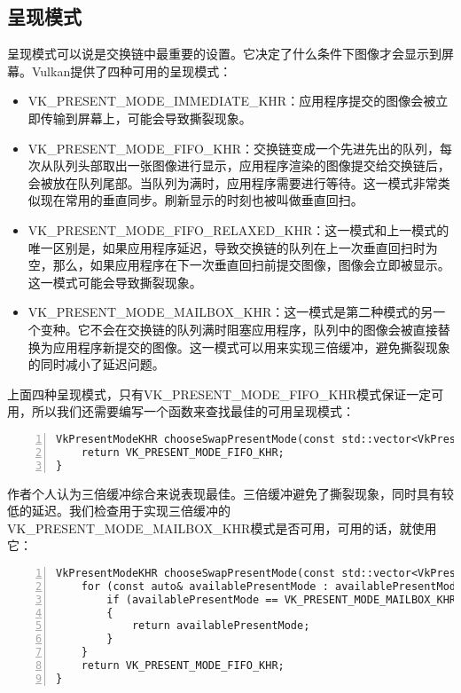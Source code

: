 \documentclass{ctexart}
\begin{document}
\subsection{呈现模式}

呈现模式可以说是交换链中最重要的设置。它决定了什么条件下图像才会显示到屏幕。Vulkan提供了四种可用的呈现模式：

\begin{itemize}
	\item VK\_PRESENT\_MODE\_IMMEDIATE\_KHR：应用程序提交的图像会被立即传输到屏幕上，可能会导致撕裂现象。
	\item VK\_PRESENT\_MODE\_FIFO\_KHR：交换链变成一个先进先出的队列，每次从队列头部取出一张图像进行显示，应用程序渲染的图像提交给交换链后，会被放在队列尾部。当队列为满时，应用程序需要进行等待。这一模式非常类似现在常用的垂直同步。刷新显示的时刻也被叫做垂直回扫。
	\item VK\_PRESENT\_MODE\_FIFO\_RELAXED\_KHR：这一模式和上一模式的唯一区别是，如果应用程序延迟，导致交换链的队列在上一次垂直回扫时为空，那么，如果应用程序在下一次垂直回扫前提交图像，图像会立即被显示。这一模式可能会导致撕裂现象。
	\item VK\_PRESENT\_MODE\_MAILBOX\_KHR：这一模式是第二种模式的另一个变种。它不会在交换链的队列满时阻塞应用程序，队列中的图像会被直接替换为应用程序新提交的图像。这一模式可以用来实现三倍缓冲，避免撕裂现象的同时减小了延迟问题。
\end{itemize}

上面四种呈现模式，只有VK\_PRESENT\_MODE\_FIFO\_KHR模式保证一定可用，所以我们还需要编写一个函数来查找最佳的可用呈现模式：

\begin{lstlisting}[language={[ANSI]C},keywordstyle=\color{blue!70},commentstyle=\color{red!50!green!50!blue!50},frame=shadowbox, rulesepcolor=\color{red!20!green!20!blue!20},basicstyle=\small,numbers=left, numberstyle=\tiny,breaklines=true]
VkPresentModeKHR chooseSwapPresentMode(const std::vector<VkPresentModeKHR> availablePresentModes) {
	return VK_PRESENT_MODE_FIFO_KHR;
}
\end{lstlisting}

作者个人认为三倍缓冲综合来说表现最佳。三倍缓冲避免了撕裂现象，同时具有较低的延迟。我们检查用于实现三倍缓冲的VK\_PRESENT\_MODE\_MAILBOX\_KHR模式是否可用，可用的话，就使用它：

\begin{lstlisting}[language={[ANSI]C},keywordstyle=\color{blue!70},commentstyle=\color{red!50!green!50!blue!50},frame=shadowbox, rulesepcolor=\color{red!20!green!20!blue!20},basicstyle=\small,numbers=left, numberstyle=\tiny,breaklines=true]
VkPresentModeKHR chooseSwapPresentMode(const std::vector<VkPresentModeKHR> availablePresentModes) {
	for (const auto& availablePresentMode : availablePresentModes) {
		if (availablePresentMode == VK_PRESENT_MODE_MAILBOX_KHR)
		{
			return availablePresentMode;
		}
	}
	return VK_PRESENT_MODE_FIFO_KHR;
}
\end{lstlisting}
\end{document}
